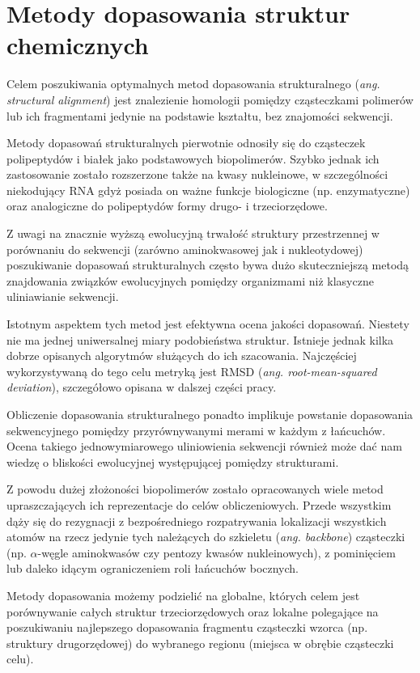 \documentclass[licencjacka]{pracamgr}
\begin{document}
\section{Metody dopasowania struktur chemicznych}
Celem poszukiwania optymalnych metod dopasowania strukturalnego (\textit{ang. structural alignment}) jest znalezienie homologii pomiędzy cząsteczkami polimerów lub ich fragmentami jedynie na podstawie kształtu, bez znajomości sekwencji. 

Metody dopasowań strukturalnych pierwotnie odnosiły się do cząsteczek polipeptydów i białek jako podstawowych biopolimerów. Szybko jednak ich zastosowanie zostało rozszerzone także na kwasy nukleinowe, w szczególności niekodujący RNA gdyż posiada on ważne funkcje biologiczne (np. enzymatyczne) oraz analogiczne do polipeptydów formy drugo- i trzeciorzędowe. 

Z uwagi na znacznie wyższą ewolucyjną trwałość struktury przestrzennej w porównaniu do sekwencji (zarówno aminokwasowej jak i nukleotydowej) poszukiwanie dopasowań strukturalnych często bywa dużo skuteczniejszą metodą znajdowania związków ewolucyjnych pomiędzy organizmami niż klasyczne uliniawianie sekwencji. 

Istotnym aspektem tych metod jest efektywna ocena jakości dopasowań. Niestety nie ma jednej uniwersalnej miary podobieństwa struktur. Istnieje jednak kilka dobrze opisanych algorytmów służących do ich szacowania. Najczęściej wykorzystywaną do tego celu metryką jest RMSD (\textit{ang. root-mean-squared deviation}), szczegółowo opisana w dalszej części pracy.

Obliczenie dopasowania strukturalnego ponadto implikuje powstanie dopasowania sekwencyjnego pomiędzy przyrównywanymi merami w każdym z łańcuchów. Ocena takiego jednowymiarowego uliniowienia sekwencji również może dać nam wiedzę o bliskości ewolucyjnej występującej pomiędzy strukturami.

Z powodu dużej złożoności biopolimerów zostało opracowanych wiele metod upraszczających ich reprezentacje do celów obliczeniowych. Przede wszystkim dąży się do rezygnacji z bezpośredniego rozpatrywania lokalizacji wszystkich atomów na rzecz jedynie tych należących do szkieletu (\textit{ang. backbone}) cząsteczki (np. $\alpha$-węgle aminokwasów czy pentozy kwasów nukleinowych), z pominięciem lub daleko idącym ograniczeniem roli łańcuchów bocznych.

Metody dopasowania możemy podzielić na globalne, których celem jest porównywanie całych struktur trzeciorzędowych oraz lokalne polegające na poszukiwaniu najlepszego dopasowania fragmentu cząsteczki wzorca (np. struktury drugorzędowej) do wybranego regionu (miejsca w obrębie cząsteczki celu).
\end{document}
